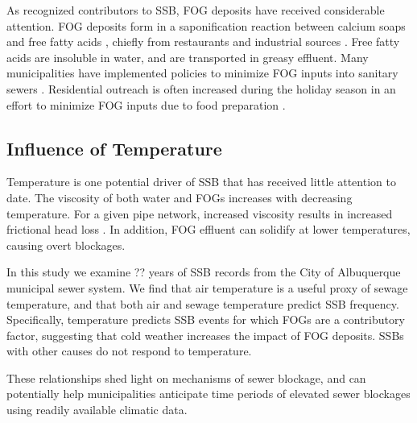 \documentclass[letterpaper,12pt]{article}
\begin{document}
As recognized contributors to SSB, FOG deposits have received considerable
attention. FOG deposits form in a saponification reaction between calcium soaps
and free fatty acids \cite{He2011}, chiefly from restaurants and
industrial sources \cite{Keener2008}.  Free fatty acids are insoluble in
water, and are transported in greasy effluent.  Many municipalities have
implemented policies to minimize FOG inputs into sanitary sewers
\cite{hassey2001grease, heckler2003best, parnell2005innovative,
bennett2006atlanta, tupper2008fog}.  Residential outreach is often increased
during the holiday season in an effort to minimize FOG inputs due to food
preparation \cite{tupper2008fog}.

\subsection*{Influence of Temperature}
Temperature is one potential driver of SSB that has received little attention to
date. The viscosity of both water and FOGs increases with decreasing
temperature. For a given pipe network, increased viscosity results in increased
frictional head loss \cite{romeo2002improved}. In addition, FOG effluent
can solidify at lower temperatures, causing overt blockages.

In this study we examine ?? years of SSB records from the City of Albuquerque
municipal sewer system.  We find that air temperature is
a useful proxy of sewage temperature, and that both air and sewage temperature
predict SSB frequency. Specifically, temperature predicts SSB events for which
FOGs are a contributory factor, suggesting that cold weather increases the impact of FOG deposits. SSBs with other causes do not respond to temperature. 

These relationships shed light on mechanisms
of sewer blockage, and can potentially help municipalities anticipate time
periods of elevated sewer blockages using readily available climatic data.



\end{document}
